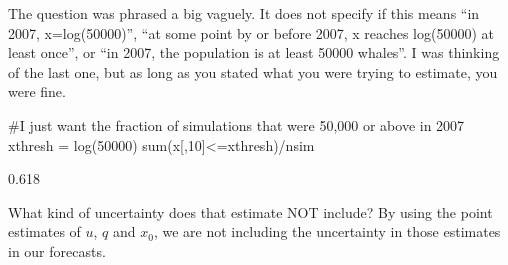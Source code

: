 \begin{wideenumerate}
\smallskip
The question was phrased a big vaguely.  It does not specify if this means ``in 2007, x=log(50000)'', ``at some point by or before 2007, x reaches log(50000) at least once'', or ``in 2007, the population is at least 50000 whales''.  I was thinking of the last one, but as long as you stated what you were trying to estimate, you were fine.
\begin{Schunk}
\begin{Sinput}
 #I just want the fraction of simulations that were 50,000 or above in 2007
 xthresh = log(50000)
 sum(x[,10]<=xthresh)/nsim
\end{Sinput}
\begin{Soutput}
[1] 0.618
\end{Soutput}
\end{Schunk}
\item What kind of uncertainty does that estimate NOT include?
\smallskip
By using the point estimates of $u$, $q$ and $x_0$, we are not including the uncertainty in those estimates in our forecasts.
\end{wideenumerate}

